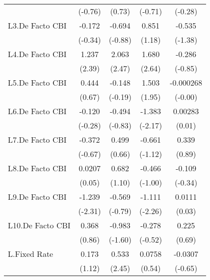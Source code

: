 {\begin{longtable}{l*{4}{c}}
                &  (-0.76)         &   (0.73)         &  (-0.71)         &  (-0.28)         \\
[1em]
L3.De Facto CBI &   -0.172         &   -0.694         &    0.851         &   -0.535         \\
                &  (-0.34)         &  (-0.88)         &   (1.18)         &  (-1.38)         \\
[1em]
L4.De Facto CBI &    1.237\sym{*}  &    2.063\sym{*}  &    1.680\sym{**} &   -0.286         \\
                &   (2.39)         &   (2.47)         &   (2.64)         &  (-0.85)         \\
[1em]
L5.De Facto CBI &    0.444         &   -0.148         &    1.503         &-0.000268         \\
                &   (0.67)         &  (-0.19)         &   (1.95)         &  (-0.00)         \\
[1em]
L6.De Facto CBI &   -0.120         &   -0.494         &   -1.383\sym{*}  &  0.00283         \\
                &  (-0.28)         &  (-0.83)         &  (-2.17)         &   (0.01)         \\
[1em]
L7.De Facto CBI &   -0.372         &    0.499         &   -0.661         &    0.339         \\
                &  (-0.67)         &   (0.66)         &  (-1.12)         &   (0.89)         \\
[1em]
L8.De Facto CBI &   0.0207         &    0.682         &   -0.466         &   -0.109         \\
                &   (0.05)         &   (1.10)         &  (-1.00)         &  (-0.34)         \\
[1em]
L9.De Facto CBI &   -1.239\sym{*}  &   -0.569         &   -1.111\sym{*}  &   0.0111         \\
                &  (-2.31)         &  (-0.79)         &  (-2.26)         &   (0.03)         \\
[1em]
L10.De Facto CBI&    0.368         &   -0.983         &   -0.278         &    0.225         \\
                &   (0.86)         &  (-1.60)         &  (-0.52)         &   (0.69)         \\
[1em]
L.Fixed Rate    &    0.173         &    0.533\sym{*}  &   0.0758         &  -0.0307         \\
                &   (1.12)         &   (2.45)         &   (0.54)         &  (-0.65)         \\

\end{longtable}}
